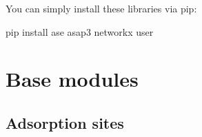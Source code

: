 \documentclass[letterpaper,10pt,english]{sphinxmanual}
\begin{document}
You can simply install these libraries via pip:

\begin{sphinxVerbatim}[commandchars=\\\{\}]
\PYGZdl{} pip install ase asap3 networkx \PYGZhy{}\PYGZhy{}user
\end{sphinxVerbatim}


\section{Base modules}
\label{\detokenize{modules:base-modules}}\label{\detokenize{modules::doc}}

\subsection{Adsorption sites}
\label{\detokenize{modules:module-acat.adsorption_sites}}\label{\detokenize{modules:adsorption-sites}}
\end{document}
